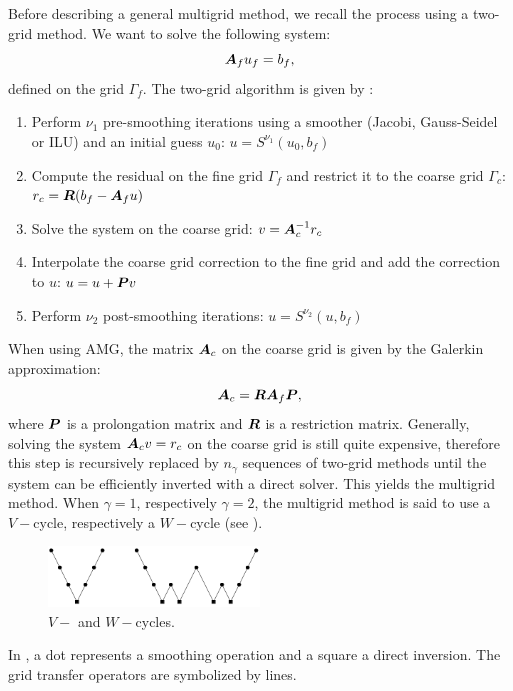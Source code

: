 {Before describing a general multigrid method, we recall the process using a 
two-grid method. We want to solve the following system:
\begin{equation}
  \boldsymbol{A}_f u_f = b_f,
\end{equation}
defined on the grid $\Gamma_f$. The two-grid algorithm is given by :
\begin{enumerate}
  \item Perform $\nu_1$ pre-smoothing iterations using a smoother (Jacobi,
    Gauss-Seidel or ILU) and an initial guess $u_0$: $u = S^{\nu_1}(u_0,b_f)$
  \item Compute the residual on the fine grid $\Gamma_f$ and restrict it to
    the coarse grid $\Gamma_c$: $r_c = \boldsymbol{R}(b_f-\boldsymbol{A}_f u)$
  \item Solve the system on the coarse grid: $v=\boldsymbol{A}_c^{-1} r_c$
  \item Interpolate the coarse grid correction to the fine grid and add the
    correction to $u$: $u=u+\boldsymbol{P}v$
  \item Perform $\nu_2$ post-smoothing iterations: $u = S^{\nu_2}(u,b_f)$
\end{enumerate}
When using AMG, the matrix $\boldsymbol{A}_c$ on the coarse grid is given by the
Galerkin approximation:
\begin{equation}
  \boldsymbol{A}_c = \boldsymbol{R} \boldsymbol{A}_f \boldsymbol{P},
\end{equation}
where $\boldsymbol{P}$ is a prolongation matrix and $\boldsymbol{R}$ is a restriction matrix. 
Generally, solving the system $\boldsymbol{A}_c v = r_c$ on the coarse grid is still
quite expensive, therefore this step is recursively replaced by $n_{\gamma}$
sequences of two-grid methods until the system can be efficiently inverted 
with a direct solver.
This yields the multigrid method. When $\gamma = 1$, respectively $\gamma =
2$, the multigrid method is said to use a $V-$cycle, respectively a $W-$cycle
(see ). 
\begin{figure}[H]
  \centering
  \includegraphics[width=0.5\textwidth]{v_w_cycles}
  \caption{$V-$ and $W-$cycles.}
  \label{fig_v_w}
\end{figure}
In , a dot represents a smoothing operation and a square a
direct inversion. The grid transfer operators are symbolized by lines.

}
